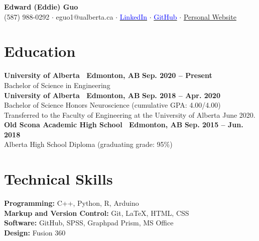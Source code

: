 \documentclass{article}
\begin{document}
\thispagestyle{plain}
\begin{flushleft}
    \LARGE \textbf{\textcolor{my_red}{Edward (Eddie) Guo}}\\ \vspace{0.25em}
    \normalfont \normalsize (587) 988-0292 $\cdot$ eguo1@ualberta.ca $\cdot$ \href{https://www.linkedin.com/in/eguo1}{\textcolor{blue}{LinkedIn}} $\cdot$ \href{https://github.com/tig3r66}{\textcolor{blue}{GitHub}} $\cdot$ \href{https://tig3r66.github.io/index.html}{Personal Website}\\
    \hrulefill
\end{flushleft}

\section*{\textcolor{my_red}{Education}}
    \textbf{University of Alberta \textbar\ Edmonton, AB} \hfill \textbf{Sep. 2020 -- Present}\\
    Bachelor of Science in Engineering\\

    \textbf{University of Alberta \textbar\ Edmonton, AB} \hfill \textbf{Sep. 2018 -- Apr. 2020}\\
    Bachelor of Science Honors Neuroscience (cumulative GPA: 4.00/4.00)\\
    Transferred to the Faculty of Engineering at the University of Alberta June 2020.\\

    \textbf{Old Scona Academic High School \textbar\ Edmonton, AB} \hfill \textbf{Sep. 2015 -- Jun. 2018}\\
    Alberta High School Diploma (graduating grade: 95\%)


\section*{\textcolor{my_red}{Technical Skills}}
\textbf{Programming:} C++, Python, R, Arduino\\
\textbf{Markup and Version Control:} Git, \LaTeX, HTML, CSS\\
\textbf{Software:} GitHub, SPSS, Graphpad Prism, MS Office\\
\textbf{Design:} Fusion 360
\end{document}
